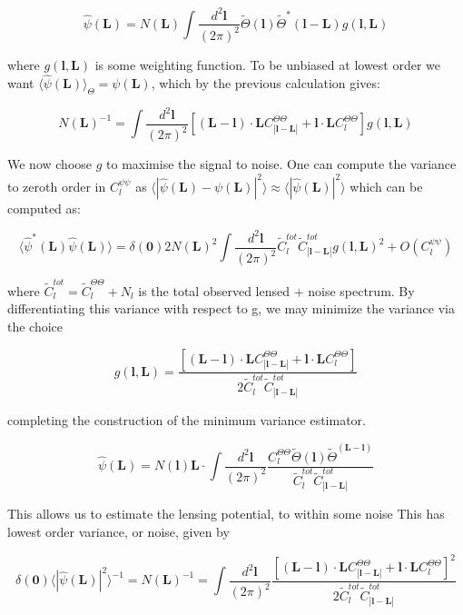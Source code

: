 \documentclass[a4paper,10pt]{article}
\renewcommand{\v}[1]{\mathbf{#1}}
\newcommand{\finttwo}[1]{\int \frac{d^2 \v{#1}}{(2\pi)^2}}
\begin{document}
\begin{equation}
\hat{\psi}(\v{L}) = N(\v{L})\finttwo{l} \tilde{\Theta}(\v{l})\tilde{\Theta}^*(\v{l-L})g(\v{l},\v{L})
\end{equation}

where $g(\v{l},\v{L})$ is some weighting function. To be unbiased at lowest order we want $\langle \hat{\psi}(\v{L}) \rangle_\Theta = \psi(\v{L})$, which by the previous calculation gives:

\begin{equation}
N(\v{L})^{-1} = \finttwo{l} [(\v{L}-\v{l})\cdot\v{L}C^{\Theta\Theta}_{|\v{l}-\v{L}|}+\v{l}\cdot\v{L}C_l^{\Theta\Theta}]g(\v{l},\v{L})
\end{equation}

We now choose $g$ to maximise the signal to noise. One can compute the variance to zeroth order in $C_l^{\psi\psi}$ as $\langle| \hat{\psi}(\v{L})-\psi(\v{L})|^2 \rangle \approx 
\langle| \hat{\psi}(\v{L})|^2 \rangle$ which can be computed as:

\begin{equation}
\langle\hat{\psi}^*(\v{L}) \hat{\psi}(\v{L}) \rangle = \delta(\v{0})2N(\v{L})^2\finttwo{l}\tilde{C}_l^{tot}\tilde{C}_{|\v{l}-\v{L}|}^{tot}g(\v{l},\v{L})^2 + O(C_l^{\psi\psi})
\end{equation}

where $\tilde{C}_l^{tot} = \tilde{C}_l^{\Theta\Theta} + N_l$ is the total observed lensed + noise spectrum. By differentiating this variance with respect to g, we may minimize the variance via the choice

\begin{equation}
g(\v{l},\v{L}) = \frac{[(\v{L}-\v{l})\cdot\v{L}C^{\Theta\Theta}_{|\v{l}-\v{L}|}+\v{l}\cdot\v{L}C_l^{\Theta\Theta}]}{2\tilde{C}_l^{tot}\tilde{C}_{|\v{l}-\v{L}|}^{tot}}
\end{equation}

completing the construction of the minimum variance estimator. 

\begin{equation}
\hat{\psi}(\v{L}) = N(\v{l})\v{L}\cdot\finttwo{l} \frac{C_l^{\Theta\Theta}\tilde{\Theta}(\v{l})\tilde{\Theta}^(\v{L-l})}{\tilde{C}_l^{tot}\tilde{C}_{|\v{l}-\v{L}|}^{tot}}
\end{equation}

This allows us to estimate the lensing potential, to within some noise This has lowest order variance, or noise, given by


\begin{equation}
\delta(\v{0}) \langle |\hat{\psi}(\v{L})|^2 \rangle^{-1} =  N(\v{L})^{-1} = \finttwo{l}  \frac{[(\v{L}-\v{l})\cdot\v{L}C^{\Theta\Theta}_{|\v{l}-\v{L}|}+\v{l}\cdot\v{L}C_l^{\Theta\Theta}]^2}{2\tilde{C}_l^{tot}\tilde{C}_{|\v{l}-\v{L}|}^{tot}}
\end{equation}
\end{document}
